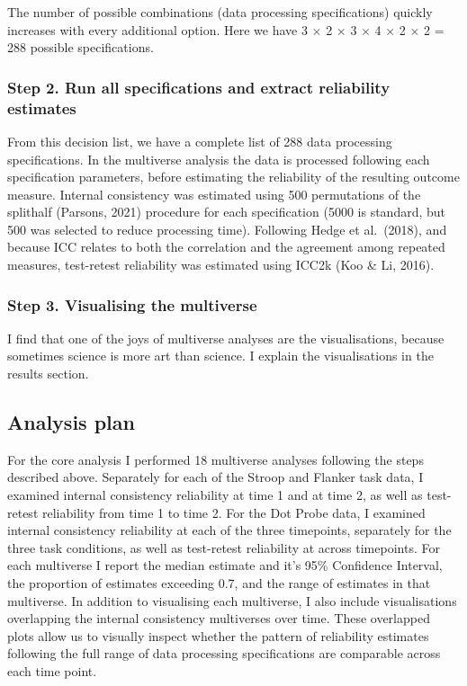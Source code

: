\documentclass[
  man,floatsintext]{apa6}
\begin{document}
The number of possible combinations (data processing specifications) quickly increases with every additional option. Here we have 3 \(\times\) 2 \(\times\) 3 \(\times\) 4 \(\times\) 2 \(\times\) 2 = 288 possible specifications.

\hypertarget{step-2.-run-all-specifications-and-extract-reliability-estimates}{%
\subsubsection{Step 2. Run all specifications and extract reliability estimates}\label{step-2.-run-all-specifications-and-extract-reliability-estimates}}

From this decision list, we have a complete list of 288 data processing specifications. In the multiverse analysis the data is processed following each specification parameters, before estimating the reliability of the resulting outcome measure. Internal consistency was estimated using 500 permutations of the splithalf (Parsons, 2021) procedure for each specification (5000 is standard, but 500 was selected to reduce processing time). Following Hedge et al.~(2018), and because ICC relates to both the correlation and the agreement among repeated measures, test-retest reliability was estimated using ICC2k (Koo \& Li, 2016).

\hypertarget{step-3.-visualising-the-multiverse}{%
\subsubsection{Step 3. Visualising the multiverse}\label{step-3.-visualising-the-multiverse}}

I find that one of the joys of multiverse analyses are the visualisations, because sometimes science is more art than science. I explain the visualisations in the results section.

\hypertarget{analysis-plan}{%
\subsection{Analysis plan}\label{analysis-plan}}

For the core analysis I performed 18 multiverse analyses following the steps described above. Separately for each of the Stroop and Flanker task data, I examined internal consistency reliability at time 1 and at time 2, as well as test-retest reliability from time 1 to time 2. For the Dot Probe data, I examined internal consistency reliability at each of the three timepoints, separately for the three task conditions, as well as test-retest reliability at across timepoints. For each multiverse I report the median estimate and it's 95\% Confidence Interval, the proportion of estimates exceeding 0.7, and the range of estimates in that multiverse. In addition to visualising each multiverse, I also include visualisations overlapping the internal consistency multiverses over time. These overlapped plots allow us to visually inspect whether the pattern of reliability estimates following the full range of data processing specifications are comparable across each time point.
\end{document}
